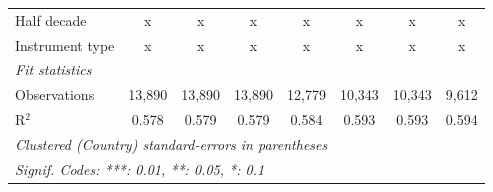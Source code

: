 \begin{tabular}{lccccccc}
   Half decade                                                                                          & x            & x            & x            & x            & x            & x            & x\\  
   Instrument type                                                                                      & x            & x            & x            & x            & x            & x            & x\\  
   \midrule \emph{Fit statistics}\\
   Observations                                                                                         & 13,890       & 13,890       & 13,890       & 12,779       & 10,343       & 10,343       & 9,612\\  
   R$^2$                                                                                                & 0.578        & 0.579        & 0.579        & 0.584        & 0.593        & 0.593        & 0.594\\  
   \midrule
   \multicolumn{8}{l}{\emph{Clustered (Country) standard-errors in parentheses}}\\
   \multicolumn{8}{l}{\emph{Signif. Codes: ***: 0.01, **: 0.05, *: 0.1}}\\
\end{tabular}
\par\endgroup


